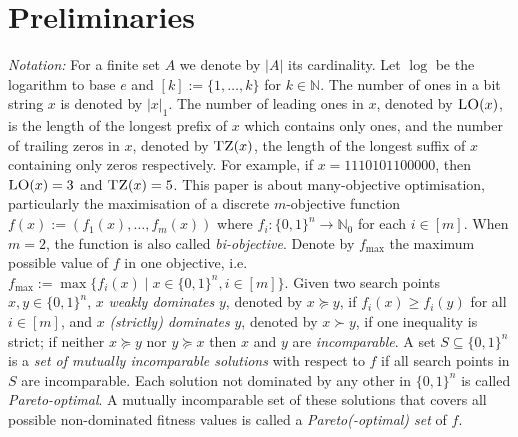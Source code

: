 \documentclass[
sigconf = false, %
review = false, %
screen = true, %
anonymous = true, %
format=acmsmall
]{acmart}
\newcommand{\ones}[1]{|#1|_1}
\newcommand{\LO}{\textsc{LO}\xspace}                      %
\newcommand{\TZ}{\textsc{TZ}\xspace}
\begin{document}
\section{Preliminaries}

\emph{Notation:} For a finite set $A$ we denote by $\vert{A}\vert$ its cardinality. %
Let $\log$ be the logarithm to base $e$ and $[k]:=\{1, \ldots , k\}$ for $k \in \mathbb{N}$. The number of ones in a bit string $x$ is denoted by $\ones{x}$. The number of leading ones in $x$, denoted by $\LO(x)$, is the length of the longest prefix of $x$ which contains only ones, and the number of trailing zeros in $x$, denoted by $\TZ(x)$, the length of the longest suffix of $x$ containing only zeros respectively. For example, if $x=1110101100000$, then $\LO(x)=3$ and $\TZ(x)=5$. %
This paper is about many-objective optimisation, particularly the maximisation of a discrete $m$-objective function $f(x):=(f_1(x), \ldots , f_m(x))$ where $f_i:\{0,1\}^n \to \mathbb{N}_0$ for each $i \in [m]$. When $m=2$, the function is also called \emph{bi-objective}. Denote by $f_{\max}$ the maximum possible value of $f$ in one objective, i.e. $f_{\max}:=\max\{f_i(x) \mid x \in \{0,1\}^n, i \in [m]\}$. %
Given two search points $x, y \in \{0, 1\}^n$, $x$ \emph{weakly dominates} $y$, denoted by $x \succeq y$,
if $f_{i}(x) \geq f_{i}(y)$ for all $i \in [m]$, and $x$ \emph{(strictly) dominates} $y$, denoted by $x \succ y$, if one inequality is strict; if neither $x \succeq y$ nor $y \succeq x$ then $x$ and $y$ are \emph{incomparable}. A set $S \subseteq \{0,1\}^n$ is a \emph{set of mutually incomparable solutions} with respect to $f$ if all search points in $S$ are incomparable. Each solution not dominated by any other in $\{0, 1\}^n$ is called \emph{Pareto-optimal}. A mutually incomparable set of these solutions that covers all possible non-dominated fitness values is called a \emph{Pareto(-optimal) set} of $f$. %
\end{document}
